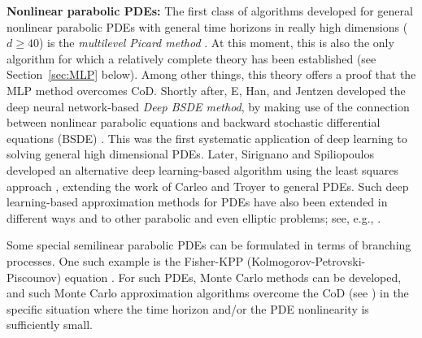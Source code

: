 \documentclass[12pt]{article}
\theoremstyle{definition}
\begin{document}
\vspace{.1in}
\noindent
{\bf  Nonlinear parabolic PDEs: }
%
The first class of algorithms developed for general nonlinear parabolic PDEs with general time horizons 
in really high dimensions ($d\geq 40$) is the 
{\it multilevel Picard method} \cite{E2016multilevel,E2019multilevel,Hutzenthaleretal2018arXiv}. 
At this moment, this is also the only algorithm for which a relatively complete theory has been established 
(see Section~\ref{sec:MLP} below).
Among other things, this theory offers a proof that the MLP method overcomes CoD.
Shortly after, E, Han, and Jentzen developed 
the deep neural network-based {\it Deep BSDE method},
by making use of the connection between nonlinear parabolic equations and backward stochastic differential
equations (BSDE) \cite{EHanJentzen2017, HanJentzenE2018}. 
This was the first systematic application of deep learning to solving general high dimensional PDEs. 
Later, Sirignano and Spiliopoulos developed an alternative deep learning-based algorithm using the least squares approach 
\cite{Sirignano2018dgm}, extending the work of Carleo and Troyer  \cite{carleo2017solving} to general PDEs. 
Such deep learning-based approximation methods for PDEs have also been 
extended in different ways and to other parabolic and even elliptic problems; 
see, e.g., \cite{beck2019machine,BeckerCheridito2019,raissi2018forward,BeckBeckerCheridito2019,BeckerCheriditoJentzen2019,HurePhamWarin2019,ChanMikaelWarin2019,Henry2017deep,han2019solving,ji2020three,han2020solving}.

Some special semilinear parabolic PDEs can be formulated in terms of branching processes. 
One such example is the Fisher-KPP (Kolmogorov-Petrovski-Piscounov) equation \cite{Fisher1937wave,KPP1937,Mckean1975application}. 
For such PDEs, Monte Carlo methods can be developed, and such Monte Carlo approximation algorithms overcome the CoD 
(see \cite{skorokhod1964branching,watanabe1965branching,Henry-Labordere2012,
Henry-Labordere2014,chang2016branching,warin2017variations,henry2019branching}) 
in the specific situation where the time horizon and/or the PDE nonlinearity is sufficiently small.
\end{document}
